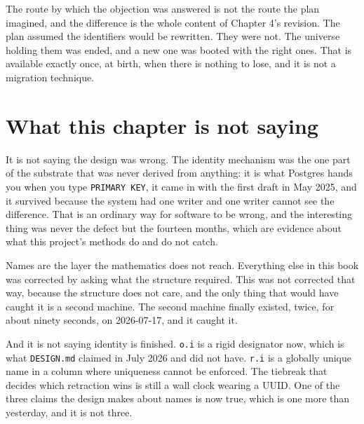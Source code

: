 The route by which the objection was answered is not the route the plan imagined, and the difference is the whole content of Chapter 4's revision. The plan assumed the identifiers would be rewritten. They were not. The universe holding them was ended, and a new one was booted with the right ones. That is available exactly once, at birth, when there is nothing to lose, and it is not a migration technique.

\section{What this chapter is not saying}

It is not saying the design was wrong. The identity mechanism was the one part of the substrate that was never derived from anything: it is what Postgres hands you when you type \texttt{PRIMARY KEY}, it came in with the first draft in May 2025, and it survived because the system had one writer and one writer cannot see the difference. That is an ordinary way for software to be wrong, and the interesting thing was never the defect but the fourteen months, which are evidence about what this project's methods do and do not catch.

Names are the layer the mathematics does not reach. Everything else in this book was corrected by asking what the structure required. This was not corrected that way, because the structure does not care, and the only thing that would have caught it is a second machine. The second machine finally existed, twice, for about ninety seconds, on 2026-07-17, and it caught it.

And it is not saying identity is finished. \texttt{o.i} is a rigid designator now, which is what \texttt{DESIGN.md} claimed in July 2026 and did not have. \texttt{r.i} is a globally unique name in a column where uniqueness cannot be enforced. The tiebreak that decides which retraction wins is still a wall clock wearing a UUID. One of the three claims the design makes about names is now true, which is one more than yesterday, and it is not three.
